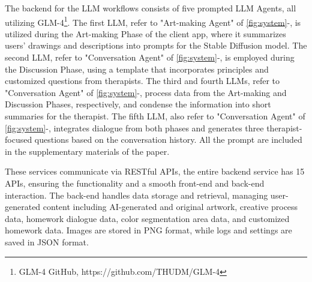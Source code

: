 The backend for the LLM workflows consists of five prompted LLM Agents, all utilizing GLM-4\footnote{GLM-4 GitHub, https://github.com/THUDM/GLM-4}. 
The first LLM, refer to "Art-making Agent" of \autoref{fig:system}-, is utilized during the Art-making Phase of the client app, where it summarizes users' drawings and descriptions into prompts for the Stable Diffusion model. The second LLM, refer to "Conversation Agent" of \autoref{fig:system}-, is employed during the Discussion Phase, using a template that incorporates principles and customized questions from therapists. The third and fourth LLMs, refer to "Conversation Agent" of \autoref{fig:system}-, process data from the Art-making and Discussion Phases, respectively, and condense the information into short summaries for the therapist. The fifth LLM, also refer to "Conversation Agent" of \autoref{fig:system}-, integrates dialogue from both phases and generates three therapist-focused questions based on the conversation history. All the prompt are included in the supplementary materials of the paper.

These services communicate via RESTful APIs, the entire backend service has 15 APIs, ensuring the functionality and a smooth front-end and back-end interaction.
The back-end handles data storage and retrieval, managing user-generated content including AI-generated and original artwork, creative process data, homework dialogue data, color segmentation area data, and customized homework data. Images are stored in PNG format, while logs and settings are saved in JSON format.

















